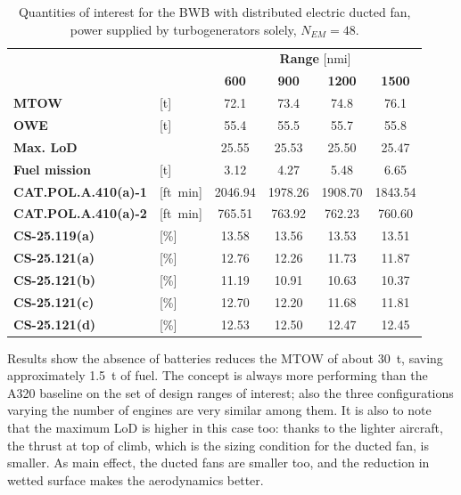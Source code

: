 \begin{table}[!h]
	\centering
	\begin{tabular}{l l c c c c}
		\cline{3-6}
		& & \multicolumn{4}{c}{\textbf{Range} [nmi]} \\
		& & \textbf{600} & \textbf{900} & \textbf{1200} & \textbf{1500} \\
		\hline
		\textbf{MTOW} & [\si{\tonne}] & 72.1 & 73.4 & 74.8 & 76.1 \\
		\textbf{OWE} & [\si{\tonne}] & 55.4 & 55.5 & 55.7 & 55.8 \\
		\textbf{Max. LoD} & & 25.55 & 25.53 & 25.50 & 25.47  \\
		\textbf{Fuel mission} & [\si{\tonne}] & 3.12 & 4.27 & 5.48 & 6.65 \\
		\hline
		\textbf{CAT.POL.A.410(a)-1} & [ft\si{\per\minute}] & 2046.94 & 1978.26 & 1908.70 & 1843.54 \\
		\textbf{CAT.POL.A.410(a)-2} & [ft\si{\per\minute}] & 765.51 & 763.92 & 762.23 & 760.60 \\
		\textbf{CS-25.119(a)} & [\%] & 13.58 & 13.56 & 13.53 & 13.51 \\
		\textbf{CS-25.121(a)} & [\%] & 12.76 & 12.26 & 11.73 & 11.87 \\
		\textbf{CS-25.121(b)} & [\%] & 11.19 & 10.91 & 10.63 & 10.37 \\
		\textbf{CS-25.121(c)} & [\%] & 12.70 & 12.20 & 11.68 & 11.81 \\
		\textbf{CS-25.121(d)} & [\%] & 12.53 & 12.50 & 12.47 & 12.45 \\
		\hline
	\end{tabular}
	\caption{Quantities of interest for the BWB with distributed electric ducted fan, power supplied by turbogenerators solely, $N_{EM}=48$.}
	\label{tab:bwb_hybrid_dep_gen_optim_res_n48}
\end{table}

Results show the absence of batteries reduces the MTOW of about 30~\si{\tonne}, saving approximately 1.5~\si{\tonne} of fuel. 
The concept is always more performing than the A320 baseline on the set of design ranges of interest; also the three configurations varying the number of engines are very similar among them. 
It is also to note that the maximum LoD is higher in this case too: thanks to the lighter aircraft, the thrust at top of climb, which is the sizing condition for the ducted fan, is smaller. 
As main effect, the ducted fans are smaller too, and the reduction in wetted surface makes the aerodynamics better. 

